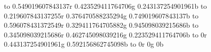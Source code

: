 
 		to 0.549019607843137r 0.423529411764706g 0.243137254901961b
 		to 0.219607843137255r 0.376470588235294g 0.749019607843137b
		to 0.596078431372549r 0.329411764705882g 0.945098039215686b
 to 0.345098039215686r 0.462745098039216g 0.223529411764706b
 to 0r 								0.443137254901961g 0.592156862745098b
			to 0r 								0g								 0b

